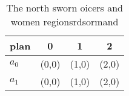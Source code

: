 \documentclass[a4paper]{article}
\begin{document}
\begin{table}
\begin{adjustbox}{width=0.6\columnwidth}
\begin{tabular}{|l|l|l|l|}
\hline
\textbf{plan} & \multicolumn{1}{c|}{\textbf{0}} & \multicolumn{1}{c|}{\textbf{1}} & \multicolumn{1}{c|}{\textbf{2}} \\ \hline
\textbf{$a_0$}  & (0,0) & (1,0) & (2,0) \\ \hline
\textbf{$a_1$}  & (0,0) & (1,0) & (2,0) \\ \hline
\end{tabular}
\end{adjustbox}
\caption{The north sworn oicers and women regionsrdsormand
}
\end{table}
\end{document}
